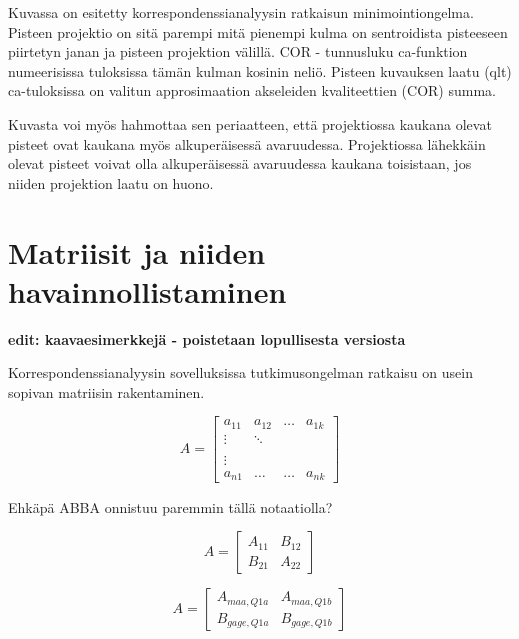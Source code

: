\documentclass[
  finnish,
]{book}
\begin{document}
Kuvassa on esitetty korrespondenssianalyysin ratkaisun minimointiongelma. Pisteen
projektio on sitä parempi mitä pienempi kulma on sentroidista pisteeseen
piirtetyn janan ja pisteen projektion välillä. COR - tunnusluku ca-funktion
numeerisissa tuloksissa tämän kulman kosinin neliö. Pisteen kuvauksen laatu (qlt)
ca-tuloksissa on valitun approsimaation akseleiden kvaliteettien (COR) summa.

Kuvasta voi myös hahmottaa sen periaatteen, että projektiossa kaukana olevat
pisteet ovat kaukana myös alkuperäisessä avaruudessa. Projektiossa lähekkäin
olevat pisteet voivat olla alkuperäisessä avaruudessa kaukana toisistaan,
jos niiden projektion laatu on huono.

\hypertarget{matriisit-ja-niiden-havainnollistaminen}{%
\section*{Matriisit ja niiden havainnollistaminen}\label{matriisit-ja-niiden-havainnollistaminen}}

\textbf{edit: kaavaesimerkkejä - poistetaan lopullisesta versiosta}

Korrespondenssianalyysin sovelluksissa tutkimusongelman ratkaisu on usein sopivan
matriisin rakentaminen.

\begin{equation}
A = \begin{bmatrix}
    a_{11} & a_{12} & \dots & a_{1k}\\
    \vdots & \ddots & \\
    \\
    \vdots \\
    a_{n1} & \dots  & \dots & a_{nk}
    \end{bmatrix}
\end{equation}

Ehkäpä ABBA onnistuu paremmin tällä notaatiolla?

\begin{equation}
A = \begin{bmatrix}
    A_{11} & B_{12}  \\
    B_{21} & A_{22}
    \end{bmatrix}
\end{equation}

\begin{equation}
A = \begin{bmatrix}
    A_{maa, Q1a} & A_{maa, Q1b}  \\
    B_{gage, Q1a} & B_{gage, Q1b}
    \end{bmatrix}
\end{equation}
\end{document}
